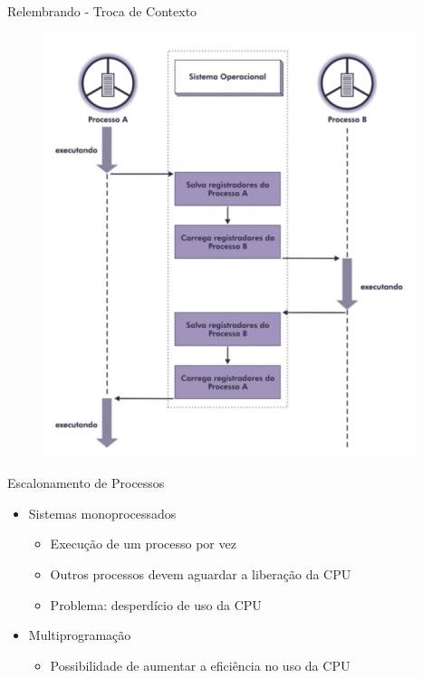 \documentclass[aspectratio=169,
				xcolor=table]{beamer}
\begin{document}
	\begin{frame}{Relembrando - Troca de Contexto}
		\begin{figure}[hbtp]
			\centering
			\includegraphics[keepaspectratio, height=.8\textheight]{../figs/cap03/contextohard.png}
		\end{figure}
	\end{frame}
	
	\begin{frame}{Escalonamento de Processos}
		\begin{itemize}
			\item Sistemas monoprocessados
			\begin{itemize}
			 	\item Execução de um processo por vez
			 	\item Outros processos devem aguardar a liberação da CPU
			 	\item \alert{Problema: desperdício de uso da CPU}
			 \end{itemize} 
			 \vspace{1em}
			 \item Multiprogramação
			 \begin{itemize}
			 	\item Possibilidade de aumentar a eficiência no uso da CPU
			 \end{itemize}
		\end{itemize}
	\end{frame}	
	
\end{document}
